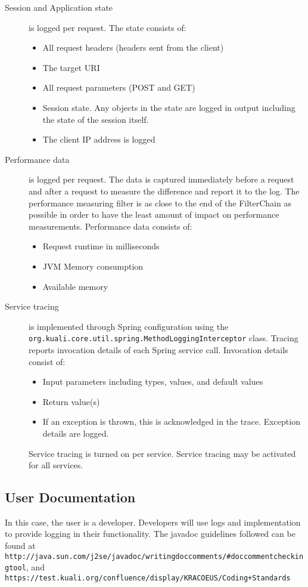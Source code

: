 \documentclass[12pt]{report}
\begin{document}
\begin{description}
\item [Session and Application state] is logged per request. The state consists of:
\begin{itemize}
  \item All request headers (headers sent from the client)
  \item The target URI
  \item All request parameters (POST and GET)
  \item Session state. Any objects in the state are logged in output including the state of the session itself.
  \item The client IP address is logged
\end{itemize}

\item [Performance data] is logged per request. The data is captured immediately before a request and after a request to measure the difference
and report it to the log. The performance measuring filter is as close to the end of the FilterChain as possible in order to have
the least amount of impact on performance measurements. Performance data consists of:
\begin{itemize}
  \item Request runtime in milliseconds
  \item JVM Memory consumption
  \item Available memory
\end{itemize}

\item [Service tracing] is implemented through Spring configuration using the \verb|org.kuali.core.util.spring.MethodLoggingInterceptor|
class. Tracing reports invocation details of each Spring service call. Invocation details consist of:
\begin{itemize}
  \item Input parameters including types, values, and default values
  \item Return value(s)
  \item If an exception is thrown, this is acknowledged in the trace. Exception details are logged.
\end{itemize}

Service tracing is turned on per service. Service tracing may be activated for all services.
\end{description}

\subsection{User Documentation}
In this case, the user is a developer. Developers will use logs and implementation to provide logging in their functionality.
The javadoc guidelines followed can be found at \verb|http://java.sun.com/j2se/javadoc/writingdoccomments/#doccommentcheckingtool|, 
and \verb|https://test.kuali.org/confluence/display/KRACOEUS/Coding+Standards|
\end{document}
